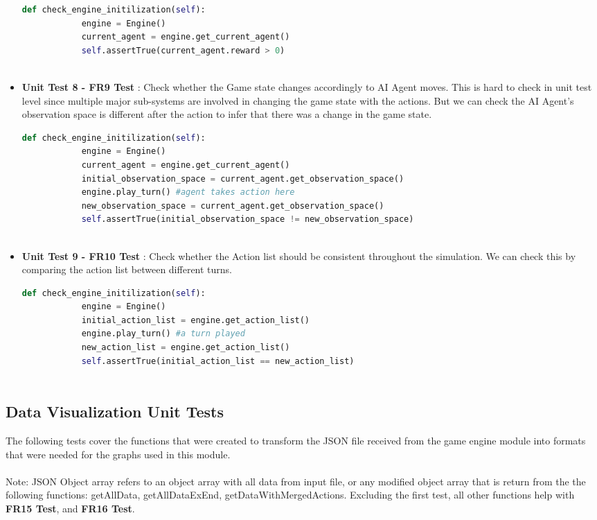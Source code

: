 \documentclass[12pt, titlepage]{article}
\providecommand{\DIFaddtex}[1]{{\protect\color{blue}\uwave{#1}}} %
\providecommand{\DIFaddbegin}{} %
\providecommand{\DIFaddend}{} %
\providecommand{\DIFadd}[1]{\texorpdfstring{\DIFaddtex{#1}}{#1}} %
\begin{document}
\begin{itemize}
    \begin{lstlisting}[language=Python]
        def check_engine_initilization(self):
            engine = Engine()
            current_agent = engine.get_current_agent()
            self.assertTrue(current_agent.reward > 0)
    
\end{lstlisting}

    \item \textbf{Unit Test 8 - FR9 Test \DIFaddbegin \DIFadd{(\ref{FRT9})}\DIFaddend }: Check whether the Game state changes accordingly to AI Agent moves. This is hard to check in unit test level since multiple major sub-systems are involved in changing the game state with the actions. But we can check the AI Agent's observation space is different after the action to infer that there was a change in the game state. 

    \begin{lstlisting}[language=Python]
        def check_engine_initilization(self):
            engine = Engine()
            current_agent = engine.get_current_agent()
            initial_observation_space = current_agent.get_observation_space()
            engine.play_turn() #agent takes action here
            new_observation_space = current_agent.get_observation_space()
            self.assertTrue(initial_observation_space != new_observation_space)
    
\end{lstlisting}    

    \item \textbf{Unit Test 9 - FR10 Test \DIFaddbegin \DIFadd{(\ref{FRT10})}\DIFaddend }: Check whether the  Action list should be consistent throughout the simulation. We can check this by comparing the action list between different turns.

    \begin{lstlisting}[language=Python]
        def check_engine_initilization(self):
            engine = Engine()
            initial_action_list = engine.get_action_list()
            engine.play_turn() #a turn played
            new_action_list = engine.get_action_list()
            self.assertTrue(initial_action_list == new_action_list)
    
\end{lstlisting}  

\end{itemize}
\newpage
\subsection{Data Visualization Unit Tests}
The following tests cover the functions that were created to transform the JSON file received from the game engine module into formats that were needed for the graphs used in this module.
\\\\
Note: JSON Object array refers to an object array with all data from input file, or any modified object array that is return from the the following functions: getAllData, getAllDataExEnd, getDataWithMergedActions. Excluding the first test, all other functions help with \textbf{FR15 Test}, and \textbf{FR16 Test}.
\end{document}
